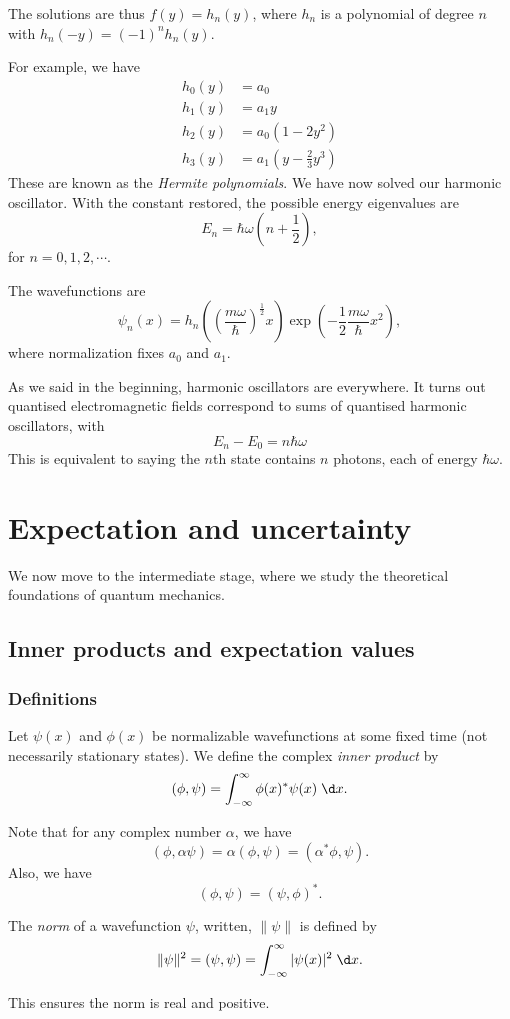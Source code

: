 \documentclass[a4paper]{article}
\begin{document}
The solutions are thus $f(y) = h_n(y)$, where $h_n$ is a polynomial of degree $n$ with $h_n(-y) = (-1)^n h_n(y)$.

For example, we have
\begin{align*}
  h_0(y) &= a_0\\
  h_1(y) &= a_1 y\\
  h_2(y) &= a_0(1 - 2y^2)\\
  h_3(y) &= a_1\left(y - \frac{2}{3}y^3\right)
\end{align*}
These are known as the \emph{Hermite polynomials}. We have now solved our harmonic oscillator. With the constant restored, the possible energy eigenvalues are
\[
  E_n = \hbar \omega \left(n + \frac{1}{2}\right),
\]
for $n = 0, 1, 2, \cdots$.

The wavefunctions are
\[
  \psi_n(x) = h_n \left(\left(\frac{m\omega}{\hbar}\right)^{\frac{1}{2}} x\right) \exp\left(-\frac{1}{2}\frac{m\omega}{\hbar} x^2\right),
\]
where normalization fixes $a_0$ and $a_1$.

As we said in the beginning, harmonic oscillators are everywhere. It turns out quantised electromagnetic fields correspond to sums of quantised harmonic oscillators, with
\[
  E_n - E_0 = n\hbar \omega
\]
This is equivalent to saying the $n$th state contains $n$ photons, each of energy $\hbar \omega$.

\section{Expectation and uncertainty}
We now move to the intermediate stage, where we study the theoretical foundations of quantum mechanics.
\subsection{Inner products and expectation values}
\subsubsection{Definitions}
\begin{defi}
  Let $\psi(x)$ and $\phi(x)$ be normalizable wavefunctions at some fixed time (not necessarily stationary states). We define the complex \emph{inner product} by
  \[
    (\phi, \psi) = \int_{-\infty}^\infty \phi(x)^* \psi (x)\;\d x.
  \]
\end{defi}
Note that for any complex number $\alpha$, we have
\[
  (\phi, \alpha \psi) = \alpha(\phi, \psi) = (\alpha^* \phi, \psi).
\]
Also, we have
\[
  (\phi, \psi) = (\psi, \phi)^*.
\]
\begin{defi}[Norm]
  The \emph{norm} of a wavefunction $\psi$, written, $\|\psi\|$ is defined by
  \[
    \|\psi\|^2 = (\psi, \psi) = \int_{-\infty}^\infty |\psi(x)|^2\;\d x.
  \]
\end{defi}
This ensures the norm is real and positive.
\end{document}
